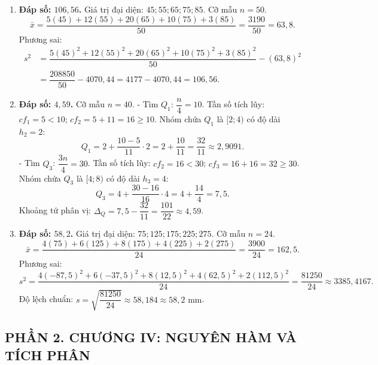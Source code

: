 \documentclass[12pt,a4paper]{article}
\begin{document}
\begin{enumerate}
\item \textbf{Đáp số: $106{,}56$.}  
Giá trị đại diện: $45; 55; 65; 75; 85$. Cỡ mẫu $n = 50$.  
\[
\bar{x} = \dfrac{5(45) + 12(55) + 20(65) + 10(75) + 3(85)}{50} = \dfrac{3190}{50} = 63{,}8.
\]
Phương sai:  
\begin{align*}
s^2 &= \dfrac{5(45)^2 + 12(55)^2 + 20(65)^2 + 10(75)^2 + 3(85)^2}{50} - (63{,}8)^2 \\
    &= \dfrac{208850}{50} - 4070{,}44 = 4177 - 4070{,}44 = 106{,}56.
\end{align*}

\item \textbf{Đáp số: $4{,}59$.}  
Cỡ mẫu $n = 40$.  
- Tìm $Q_1$: $\dfrac{n}{4} = 10$. Tần số tích lũy: $cf_1 = 5 < 10$; $cf_2 = 5 + 11 = 16 \ge 10$.  
Nhóm chứa $Q_1$ là $[2; 4)$ có độ dài $h_2 = 2$:  
\[
Q_1 = 2 + \dfrac{10 - 5}{11} \cdot 2 = 2 + \dfrac{10}{11} = \dfrac{32}{11} \approx 2{,}9091.
\]
- Tìm $Q_3$: $\dfrac{3n}{4} = 30$. Tần số tích lũy: $cf_2 = 16 < 30$; $cf_3 = 16 + 16 = 32 \ge 30$.  
Nhóm chứa $Q_3$ là $[4; 8)$ có độ dài $h_3 = 4$:  
\[
Q_3 = 4 + \dfrac{30 - 16}{16} \cdot 4 = 4 + \dfrac{14}{4} = 7{,}5.
\]
Khoảng tứ phân vị: $\Delta_Q = 7{,}5 - \dfrac{32}{11} = \dfrac{101}{22} \approx 4{,}59$.

\item \textbf{Đáp số: $58{,}2$.}  
Giá trị đại diện: $75; 125; 175; 225; 275$. Cỡ mẫu $n = 24$.  
\[
\bar{x} = \dfrac{4(75) + 6(125) + 8(175) + 4(225) + 2(275)}{24} = \dfrac{3900}{24} = 162{,}5.
\]
Phương sai:  
\[
s^2 = \dfrac{4(-87{,}5)^2 + 6(-37{,}5)^2 + 8(12{,}5)^2 + 4(62{,}5)^2 + 2(112{,}5)^2}{24} = \dfrac{81250}{24} \approx 3385{,}4167.
\]
Độ lệch chuẩn: $s = \sqrt{\dfrac{81250}{24}} \approx 58{,}184 \approx 58{,}2\text{ mm}$.
\end{enumerate}

\subsection*{PHẦN 2. CHƯƠNG IV: NGUYÊN HÀM VÀ TÍCH PHÂN}
\end{document}

